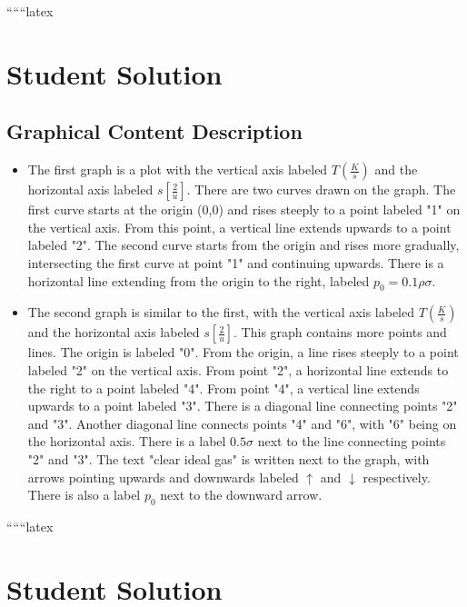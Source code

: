 
``````latex


\section*{Student Solution}

\subsection*{Graphical Content Description}

\begin{itemize}
    \item The first graph is a plot with the vertical axis labeled \( T \left( \frac{K}{s} \right) \) and the horizontal axis labeled \( s \left[ \frac{2}{u} \right] \). There are two curves drawn on the graph. The first curve starts at the origin (0,0) and rises steeply to a point labeled "1" on the vertical axis. From this point, a vertical line extends upwards to a point labeled "2". The second curve starts from the origin and rises more gradually, intersecting the first curve at point "1" and continuing upwards. There is a horizontal line extending from the origin to the right, labeled \( p_0 = 0.1 \rho \sigma \).
    
    \item The second graph is similar to the first, with the vertical axis labeled \( T \left( \frac{K}{s} \right) \) and the horizontal axis labeled \( s \left[ \frac{2}{u} \right] \). This graph contains more points and lines. The origin is labeled "0". From the origin, a line rises steeply to a point labeled "2" on the vertical axis. From point "2", a horizontal line extends to the right to a point labeled "4". From point "4", a vertical line extends upwards to a point labeled "3". There is a diagonal line connecting points "2" and "3". Another diagonal line connects points "4" and "6", with "6" being on the horizontal axis. There is a label \( 0.5 \sigma \) next to the line connecting points "2" and "3". The text "clear ideal gas" is written next to the graph, with arrows pointing upwards and downwards labeled \( \uparrow \) and \( \downarrow \) respectively. There is also a label \( p_0 \) next to the downward arrow.
\end{itemize}

``````latex


\section*{Student Solution}

